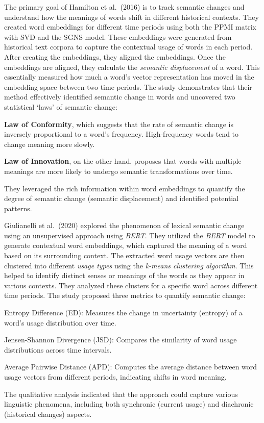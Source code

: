 The primary goal of Hamilton et al.\ (2016) is to track semantic changes and understand how the meanings of words shift in different historical contexts.
They created word embeddings for different time periods using both the PPMI matrix with SVD and the SGNS model.
These embeddings were generated from historical text corpora to capture the contextual usage of words in each period.
After creating the embeddings, they aligned the embeddings.
Once the embeddings are aligned, they calculate the \emph{semantic displacement} of a word.
This essentially measured how much a word's vector representation has moved in the embedding space between two time periods.
The study demonstrates that their method effectively identified semantic change in words and uncovered two statistical `laws' of semantic change:
\begin{packed_enumerate}
    \item \textbf{Law of Conformity}, which suggests that the rate of semantic change is inversely proportional to a word's frequency.
    High-frequency words tend to change meaning more slowly.
    \item \textbf{Law of Innovation}, on the other hand, proposes that words with multiple meanings are more likely to undergo semantic transformations over time.
\end{packed_enumerate}
They leveraged the rich information within word embeddings to quantify the degree of semantic change (semantic displacement) and identified potential patterns.

Giulianelli et al.\ (2020) explored the phenomenon of lexical semantic change using an unsupervised approach using \emph{BERT}.
They utilized the \emph{BERT} model to generate contextual word embeddings, which captured the meaning of a word based on its surrounding context.
The extracted word usage vectors are then clustered into different \emph{usage types} using the \emph{k-means clustering algorithm}.
This helped to identify distinct senses or meanings of the words as they appear in various contexts.
They analyzed these clusters for a specific word across different time periods.
The study proposed three metrics to quantify semantic change:
\begin{packed_enumerate}
    \item Entropy Difference (ED): Measures the change in uncertainty (entropy) of a word’s usage distribution over time.
    \item Jensen-Shannon Divergence (JSD): Compares the similarity of word usage distributions across time intervals.
    \item Average Pairwise Distance (APD): Computes the average distance between word usage vectors from different periods, indicating shifts in word meaning.
\end{packed_enumerate}
The qualitative analysis indicated that the approach could capture various linguistic phenomena, including both synchronic (current usage) and diachronic (historical changes) aspects.

